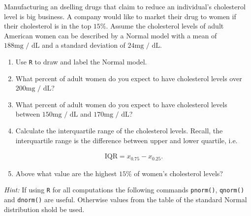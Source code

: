 
\begin{exercise}

Manufacturing an dselling drugs that claim to reduce an individual's cholesterol level is big business.
A company would like to market their drug to women if their cholesterol is in the top $15 \%$.
Assume the cholesterol levels of adult American women can be described by a Normal model with a mean of $188 \text{mg / dL}$ and a standard deviation of $24 \text{mg / dL}$.

\begin{enumerate}[label = (\alph*)]

    \item Use \texttt R to draw and label the Normal model.
    
    \item What percent of adult women do you expect to have cholesterol levels over $200 \text{mg / dL}$?
    
    \item What percent of adult women do you expect to have cholesterol levels between $150 \text{mg / dL}$ and $170 \text{mg / dL}$?
    
    \item Calculate the interquartile range of the cholesterol levels.
    Recall, the interquartile range is the difference between upper and lower quartile, i.e.

    \begin{align*}
        \mathrm{IQR} = x_{0.75} - x_{0.25}.
    \end{align*}

    \item Above what value are the highest $15 \%$ of women's cholesterol levels?

\end{enumerate}

\textit{Hint:}
If using \texttt R for all computations the following commands \texttt{pnorm()}, \texttt{qnorm()} and \texttt{dnorm()} are useful.
Otherwise values from the table of the standard Normal distribution shold be used.

\end{exercise}


